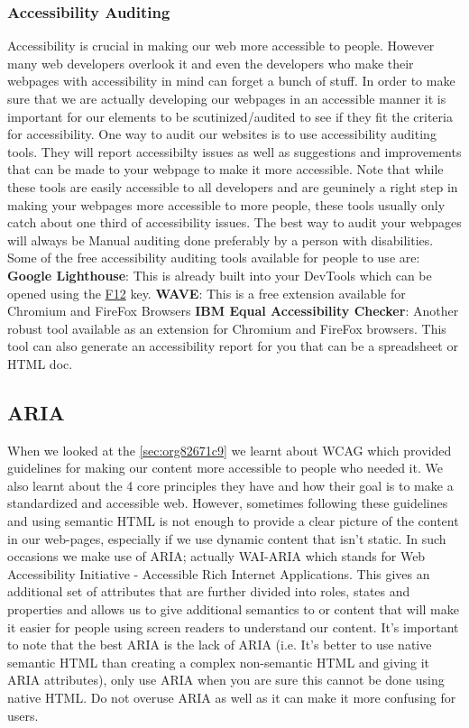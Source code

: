 \documentclass[11pt]{article}
\begin{document}
\subsubsection{Accessibility Auditing}
\label{sec:orgde35140}
Accessibility is crucial in making our web more accessible to people. However many web developers
overlook it and even the developers who make their webpages with accessibility in mind can forget a
bunch of stuff. In order to make sure that we are actually developing our webpages in an accessible
manner it is important for our elements to be scutinized/audited to see if they fit the criteria for
accessibility.
One way to audit our websites is to use accessibility auditing tools. They will report
accessibilty issues as well as suggestions and improvements that can be made to your webpage to make
it more accessible. Note that while these tools are easily accessible to all developers and are
geuninely a right step in making your webpages more accessible to more people, these tools usually
only catch about one third of accessibility issues. The best way to audit your webpages will always
be Manual auditing done preferably by a person with disabilities.
Some of the free accessibility auditing tools available for people to use are:
\textbf{Google Lighthouse}: This is already built into your DevTools which can be opened using the \uline{F12} key.
\textbf{WAVE}: This is a free extension available for Chromium and FireFox Browsers
\textbf{IBM Equal Accessibility Checker}: Another robust tool available as an extension for Chromium and
FireFox browsers. This tool can also generate an accessibility report for you that can be a
spreadsheet or HTML doc.
\subsection{ARIA}
\label{sec:org0d3ece1}
When we looked at the \ref{sec:org82671c9} we learnt about WCAG which provided guidelines
for making our content more accessible to people who needed it. We also learnt about the 4 core
principles they have and how their goal is to make a standardized and accessible web. However,
sometimes following these guidelines and using semantic HTML is not enough to provide a clear
picture of the content in our web-pages, especially if we use dynamic content that isn't static. In
such occasions we make use of ARIA; actually WAI-ARIA which stands for Web Accessibility
Initiative - Accessible Rich Internet Applications. This gives an additional set of attributes that
are further divided into roles, states and properties and allows us to give additional semantics to
or content that will make it easier for people using screen readers to understand our content. It's
important to note that the best ARIA is the lack of ARIA (i.e. It's better to use native semantic
HTML than creating a complex non-semantic HTML and giving it ARIA attributes), only use ARIA when
you are sure this cannot be done using native HTML. Do not overuse ARIA as well as it can make it
more confusing for users.
\end{document}
